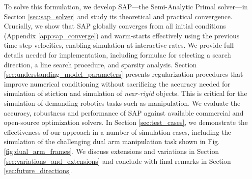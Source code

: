 To solve this formulation, we develop SAP---the Semi-Analytic Primal solver---in
Section \ref{sec:sap_solver} and study its theoretical and practical
convergence.  Crucially, we show that SAP globally converges from all initial
conditions (Appendix \ref{app:sap_converge}) and warm-starts effectively using
the previous time-step velocities, enabling simulation at interactive rates. We
provide full details needed for implementation, including formulae for selecting
a search direction, a line search procedure, and sparsity analysis. Section
\ref{sec:understanding_model_parameters} presents regularization procedures that
improve numerical conditioning without sacrificing the accuracy needed for
simulation of stiction and simulation of \emph{near-rigid} objects. This is
critical for the simulation of demanding robotics tasks such as manipulation. We
evaluate the accuracy, robustness and performance of SAP against available
commercial and open-source optimization solvers. In Section
\ref{sec:test_cases}, we demonstrate the effectiveness of our approach in a
number of simulation cases, including the simulation of the challenging dual arm
manipulation task shown in Fig. \ref{fig:dual_arm_frames}. We discuss extensions
and variations in Section \ref{sec:variations_and_extensions} and conclude with
final remarks in Section \ref{sec:future_directions}.

